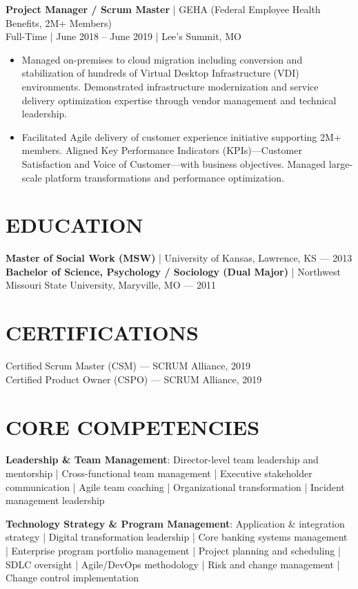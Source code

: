 \documentclass[10pt]{article}
\begin{document}
\noindent
\textbf{Project Manager / Scrum Master} | GEHA (Federal Employee Health Benefits, 2M+ Members)\\
Full-Time | June 2018 – June 2019 | Lee's Summit, MO
\begin{itemize}
  \setlength\itemsep{0.05in}
  \item Managed on-premises to cloud migration including conversion and stabilization of hundreds of Virtual Desktop Infrastructure (VDI) environments. Demonstrated infrastructure modernization and service delivery optimization expertise through vendor management and technical leadership.

  \item Facilitated Agile delivery of customer experience initiative supporting 2M+ members. Aligned Key Performance Indicators (KPIs)---Customer Satisfaction and Voice of Customer---with business objectives. Managed large-scale platform transformations and performance optimization.
\end{itemize}

\section*{EDUCATION}

\noindent
\textbf{Master of Social Work (MSW)} | University of Kansas, Lawrence, KS --- 2013\\
\textbf{Bachelor of Science, Psychology / Sociology (Dual Major)} | Northwest Missouri State University, Maryville, MO --- 2011

\section*{CERTIFICATIONS}

\noindent
Certified Scrum Master (CSM) --- SCRUM Alliance, 2019\\
Certified Product Owner (CSPO) --- SCRUM Alliance, 2019

\section*{CORE COMPETENCIES}

\noindent
\textbf{Leadership \& Team Management}: Director-level team leadership and mentorship | Cross-functional team management | Executive stakeholder communication | Agile team coaching | Organizational transformation | Incident management leadership

\vspace{0.08in}
\noindent
\textbf{Technology Strategy \& Program Management}: Application \& integration strategy | Digital transformation leadership | Core banking systems management | Enterprise program portfolio management | Project planning and scheduling | SDLC oversight | Agile/DevOps methodology | Risk and change management | Change control implementation
\end{document}
